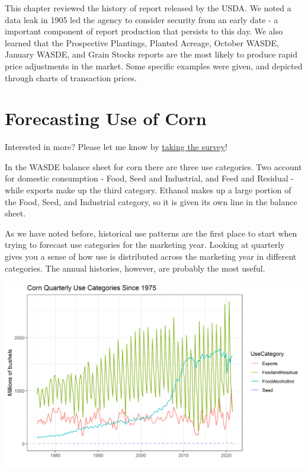 \documentclass[
  letterpaper,
  DIV=11,
  numbers=noendperiod]{scrreprt}
\begin{document}
This chapter reviewed the history of report released by the USDA. We
noted a data leak in 1905 led the agency to consider security from an
early date - a important component of report production that persists to
this day. We also learned that the Prospective Plantings, Planted
Acreage, October WASDE, January WASDE, and Grain Stocks reports are the
most likely to produce rapid price adjustments in the market. Some
specific examples were given, and depicted through charts of transaction
prices.


\hypertarget{forecasting-use-of-corn}{%
\chapter{Forecasting Use of Corn}\label{forecasting-use-of-corn}}

{Interested in more? Please let me know by}
\href{https://forms.gle/Q3VByCQZHjfQSy9D7}{taking the survey}!

In the WASDE balance sheet for corn there are three use categories. Two
account for domestic consumption - Food, Seed and Industrial, and Feed
and Residual - while exports make up the third category. Ethanol makes
up a large portion of the Food, Seed, and Industrial category, so it is
given its own line in the balance sheet.

As we have noted before, historical use patterns are the first place to
start when trying to forecast use categories for the marketing year.
Looking at quarterly gives you a sense of how use is distributed across
the marketing year in different categories. The annual histories,
however, are probably the most useful.

\includegraphics{assets/ForecastingUseof-CornUseCategories.png}
\end{document}
